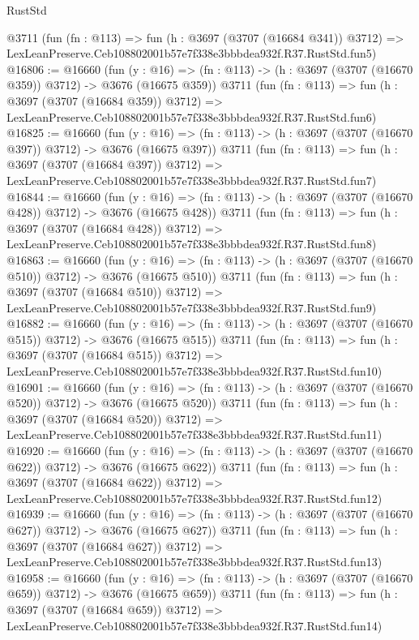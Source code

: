 \begin{lexlean}{RustStd}
\begin{coremodule}
    @3711
    (fun (fn : @113) =>
    fun (h : @3697 (@3707 (@16684 @341)) @3712) =>
    LexLeanPreserve.Ceb108802001b57e7f338e3bbbdea932f.R37.RustStd.fun5)
@16806 := @16660
    (fun (y : @16) => (fn : @113) -> (h : @3697 (@3707 (@16670 @359)) @3712) -> @3676 (@16675 @359))
    @3711
    (fun (fn : @113) =>
    fun (h : @3697 (@3707 (@16684 @359)) @3712) =>
    LexLeanPreserve.Ceb108802001b57e7f338e3bbbdea932f.R37.RustStd.fun6)
@16825 := @16660
    (fun (y : @16) => (fn : @113) -> (h : @3697 (@3707 (@16670 @397)) @3712) -> @3676 (@16675 @397))
    @3711
    (fun (fn : @113) =>
    fun (h : @3697 (@3707 (@16684 @397)) @3712) =>
    LexLeanPreserve.Ceb108802001b57e7f338e3bbbdea932f.R37.RustStd.fun7)
@16844 := @16660
    (fun (y : @16) => (fn : @113) -> (h : @3697 (@3707 (@16670 @428)) @3712) -> @3676 (@16675 @428))
    @3711
    (fun (fn : @113) =>
    fun (h : @3697 (@3707 (@16684 @428)) @3712) =>
    LexLeanPreserve.Ceb108802001b57e7f338e3bbbdea932f.R37.RustStd.fun8)
@16863 := @16660
    (fun (y : @16) => (fn : @113) -> (h : @3697 (@3707 (@16670 @510)) @3712) -> @3676 (@16675 @510))
    @3711
    (fun (fn : @113) =>
    fun (h : @3697 (@3707 (@16684 @510)) @3712) =>
    LexLeanPreserve.Ceb108802001b57e7f338e3bbbdea932f.R37.RustStd.fun9)
@16882 := @16660
    (fun (y : @16) => (fn : @113) -> (h : @3697 (@3707 (@16670 @515)) @3712) -> @3676 (@16675 @515))
    @3711
    (fun (fn : @113) =>
    fun (h : @3697 (@3707 (@16684 @515)) @3712) =>
    LexLeanPreserve.Ceb108802001b57e7f338e3bbbdea932f.R37.RustStd.fun10)
@16901 := @16660
    (fun (y : @16) => (fn : @113) -> (h : @3697 (@3707 (@16670 @520)) @3712) -> @3676 (@16675 @520))
    @3711
    (fun (fn : @113) =>
    fun (h : @3697 (@3707 (@16684 @520)) @3712) =>
    LexLeanPreserve.Ceb108802001b57e7f338e3bbbdea932f.R37.RustStd.fun11)
@16920 := @16660
    (fun (y : @16) => (fn : @113) -> (h : @3697 (@3707 (@16670 @622)) @3712) -> @3676 (@16675 @622))
    @3711
    (fun (fn : @113) =>
    fun (h : @3697 (@3707 (@16684 @622)) @3712) =>
    LexLeanPreserve.Ceb108802001b57e7f338e3bbbdea932f.R37.RustStd.fun12)
@16939 := @16660
    (fun (y : @16) => (fn : @113) -> (h : @3697 (@3707 (@16670 @627)) @3712) -> @3676 (@16675 @627))
    @3711
    (fun (fn : @113) =>
    fun (h : @3697 (@3707 (@16684 @627)) @3712) =>
    LexLeanPreserve.Ceb108802001b57e7f338e3bbbdea932f.R37.RustStd.fun13)
@16958 := @16660
    (fun (y : @16) => (fn : @113) -> (h : @3697 (@3707 (@16670 @659)) @3712) -> @3676 (@16675 @659))
    @3711
    (fun (fn : @113) =>
    fun (h : @3697 (@3707 (@16684 @659)) @3712) =>
    LexLeanPreserve.Ceb108802001b57e7f338e3bbbdea932f.R37.RustStd.fun14)

\end{coremodule}
\end{lexlean}
